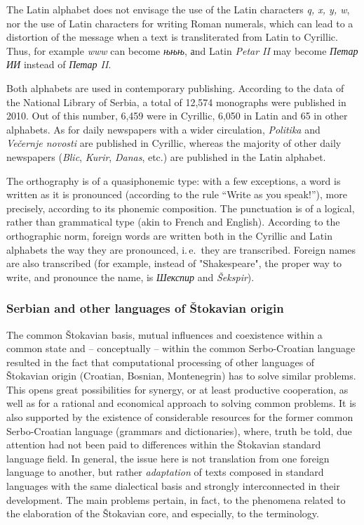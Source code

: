 {\begin{multicols}{2}
The Latin alphabet does not envisage the use of the Latin characters \textit{q, x, y, w}, nor the use of Latin characters for writing Roman numerals, which can lead to a distortion of the message when a text is transliterated from Latin to Cyrillic.  Thus, for 
example \textit{www} can become \textit{њњњ}, аnd Latin \textit{Petar II} may become \textit{Петар ИИ} instead of \textit{Петар II}. 

Both alphabets are used in contemporary publishing. According to the data of the National Library of Serbia, a total of 12,574  monographs were published in 2010. Out of this number, 6,459 were in Cyrillic, 6,050 in Latin and 65 in other alphabets. As for daily newspapers with a wider circulation, \textit{Politika} and \textit{Večernje novosti} are published in Cyrillic, whereas the majority of other daily newspapers (\textit{Blic}, \textit{Kurir}, \textit{Danas}, etc.) are published in the Latin alphabet. 

The orthography is of a quasiphonemic type: with a few exceptions, a word is written as it is pronounced (according to the rule “Write as you speak!”), more precisely, according to its phonemic composition. 
The punctuation is of a logical, rather than grammatical type (akin to French and English).
According to the orthographic norm, foreign words are written both in the Cyrillic and Latin alphabets the way they are pronounced, i.\,e.~they are transcribed. Foreign names are also transcribed (for example, instead of "Shakespeare", the proper way to write, and pronounce the name, is \textit{Шекспир} and \textit{Šekspir}).

\subsubsection {Serbian and other languages of Štokavian origin}

The common Štokavian basis, mutual influences and coexistence within a common state and – conceptually – within the common Serbo-Croatian language resulted in the fact that computational processing of other languages of Štokavian origin (Croatian, Bosnian, Montenegrin) has to solve similar problems. This opens great possibilities for synergy, or at least productive cooperation, as well as for a rational and economical approach to solving common problems. It is also supported by the existence of considerable resources for the former common Serbo-Croatian language (grammars and dictionaries), where, truth be told, due attention had not been paid to differences within the Štokavian standard language field. In general, the issue here is not translation from one foreign language to another, but rather \textit{adaptation} of texts composed in standard languages with the same dialectical basis and strongly interconnected in their development. 
The main problems pertain, in fact, to the phenomena related to the elaboration of the Štokavian core, and especially, to the terminology.


\end{multicols}}
